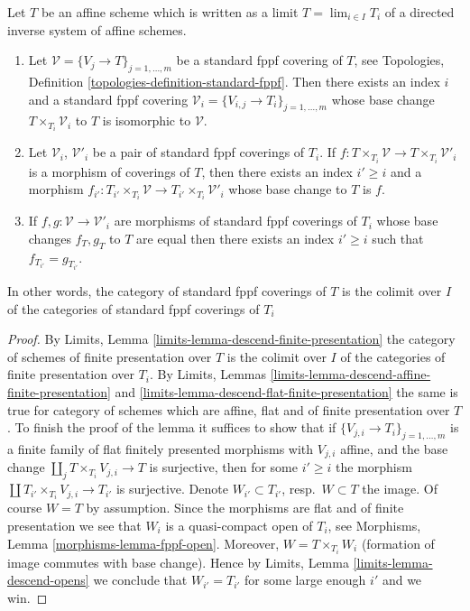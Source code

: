 \begin{lemma}
\label{lemma-limit-fppf-topology}
Let $T$ be an affine scheme which is written as a limit
$T = \lim_{i \in I} T_i$ of a directed inverse system of affine schemes.
\begin{enumerate}
\item Let $\mathcal{V} = \{V_j \to T\}_{j = 1, \ldots, m}$ be a standard fppf
covering of $T$, see
Topologies, Definition \ref{topologies-definition-standard-fppf}.
Then there exists an index $i$ and a standard fppf covering
$\mathcal{V}_i = \{V_{i, j} \to T_i\}_{j = 1, \ldots, m}$
whose base change $T \times_{T_i} \mathcal{V}_i$ to $T$
is isomorphic to $\mathcal{V}$.
\item Let $\mathcal{V}_i$, $\mathcal{V}'_i$ be a pair of standard
fppf coverings of $T_i$. If
$f : T \times_{T_i} \mathcal{V} \to T \times_{T_i} \mathcal{V}'_i$ is
a morphism of coverings of $T$, then there exists an index
$i' \geq i$ and a morphism
$f_{i'} : T_{i'} \times_{T_i} \mathcal{V} \to
T_{i'} \times_{T_i} \mathcal{V}'_i$
whose base change to $T$ is $f$.
\item If
$f, g : \mathcal{V} \to \mathcal{V}'_i$
are morphisms of standard fppf coverings of $T_i$ whose
base changes $f_T, g_T$ to $T$ are equal then there exists an
index $i' \geq i$ such that $f_{T_{i'}} = g_{T_{i'}}$.
\end{enumerate}
In other words, the category of standard fppf coverings of $T$ is
the colimit over $I$ of the categories of standard fppf coverings of $T_i$
\end{lemma}

\begin{proof}
By
Limits, Lemma \ref{limits-lemma-descend-finite-presentation}
the category of schemes of finite presentation over $T$ is the
colimit over $I$ of the categories of finite presentation over $T_i$. By
Limits, Lemmas \ref{limits-lemma-descend-affine-finite-presentation}
and \ref{limits-lemma-descend-flat-finite-presentation}
the same is true for category of schemes which are affine, flat and
of finite presentation over $T$.
To finish the proof of the lemma it suffices to show that if
$\{V_{j, i} \to T_i\}_{j = 1, \ldots, m}$ is a finite family of
flat finitely presented morphisms with $V_{j, i}$ affine, and the
base change $\coprod_j T \times_{T_i} V_{j, i} \to T$ is surjective,
then for some $i' \geq i$ the morphism
$\coprod T_{i'} \times_{T_i} V_{j, i} \to T_{i'}$ is surjective.
Denote $W_{i'} \subset T_{i'}$, resp.\ $W \subset T$ the image.
Of course $W = T$ by assumption.
Since the morphisms are flat and of finite presentation we see that
$W_i$ is a quasi-compact open of $T_i$, see
Morphisms, Lemma \ref{morphisms-lemma-fppf-open}.
Moreover, $W = T \times_{T_i} W_i$ (formation of image commutes
with base change). Hence by
Limits, Lemma \ref{limits-lemma-descend-opens}
we conclude that $W_{i'} = T_{i'}$ for some large enough $i'$
and we win.
\end{proof}

